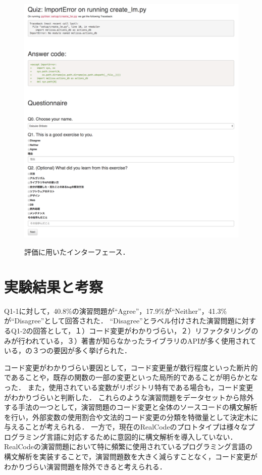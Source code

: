 \begin{figure}[H]
　\centering
  \includegraphics[width=1.0\columnwidth]{20181218-lab-study-interface-all.png}
  \caption{評価に用いたインターフェース．}
  \label{fig:lab-study}
\end{figure}

\section{実験結果と考察}

Q1-1に対して，40.8\%の演習問題が``Agree''，17.9\%が``Neither''，41.3\%が``Disagree''として回答された．
``Disagree''とラベル付けされた演習問題に対するQ1-2の回答として，１）コード変更がわかりづらい，２）リファクタリングのみが行われている，３）著書が知らなかったライブラリのAPIが多く使用されている，の３つの要因が多く挙げられた．

コード変更がわかりづらい要因として，コード変更量が数行程度といった断片的であることや，既存の関数の一部の変更といった局所的であることが明らかとなった．
また，使用されている変数がリポジトリ特有である場合も，コード変更がわかりづらいと判断した．
これらのような演習問題をデータセットから除外する手法の一つとして，演習問題のコード変更と全体のソースコードの構文解析を行い，外部変数の使用割合や文法的コード変更の分類を特徴量として決定木に与えることが考えられる．
一方で，現在のRealCodeのプロトタイプは様々なプログラミング言語に対応するために意図的に構文解析を導入していない．
RealCodeの演習問題において特に頻繁に使用されているプログラミング言語の構文解析を実装することで，演習問題数を大きく減らすことなく，コード変更がわかりづらい演習問題を除外できると考えられる．


